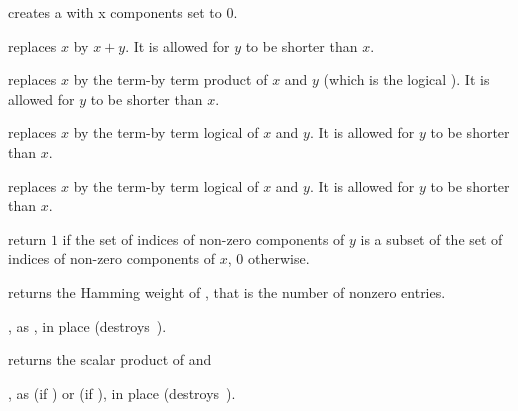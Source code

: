  creates a  with  x
 components set to $0$.











 replaces $x$ by $x+y$. It is
allowed for $y$ to be shorter than $x$.

 replaces $x$ by the term-by term product
of $x$ and $y$ (which is the logical ). It is allowed for $y$ to be
shorter than $x$.

 replaces $x$ by the term-by term
logical  of $x$ and $y$. It is allowed for $y$ to be
shorter than $x$.

 replaces $x$ by the term-by term
logical  of $x$ and $y$. It is allowed for $y$ to be
shorter than $x$.

 return $1$ if the set of indices of
non-zero components of $y$ is a subset of the set of indices of
non-zero components of $x$, $0$ otherwise.

 returns the Hamming weight of , that is
the number of nonzero entries.


, as , in place (destroys~).


 returns the scalar product of 
and 



, as  (if
) or  (if ), in place
(destroys~).

